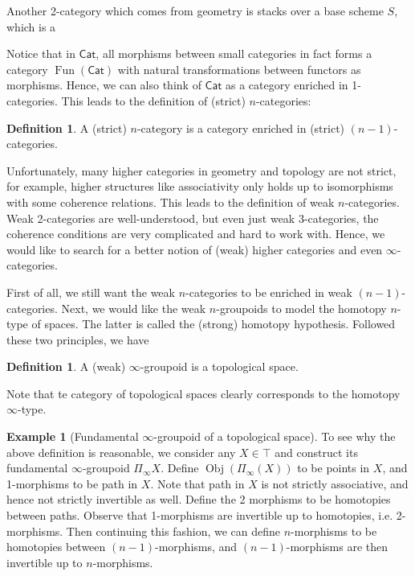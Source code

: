 \documentclass[11pt]{amsart}
\numberwithin{equation}{section}
\theoremstyle{definition}
\newtheorem{example}[thm]{Example}
\newtheorem{defn}[thm]{Definition}
\theoremstyle{remark}
\numberwithin{equation}{section}
\newcommand{\ob}{\operatorname{Obj}}
\newcommand{\cat}{\mathsf{Cat}}
\newcommand{\fun}{\operatorname{Fun}}
\begin{document}
Another 2-category which comes from geometry is stacks over a base scheme $S$, which is a 

Notice that in $\cat$, all morphisms between small categories in fact forms a category $\fun(\cat)$ with natural transformations between functors as morphisms. Hence, we can also think of $\cat$ as a category enriched in 1-categories. This leads to the definition of (strict) $n$-categories:

\begin{defn}
	A (strict) $n$-category is a category enriched in (strict) $(n-1)$-categories.
\end{defn}

Unfortunately, many higher categories in geometry and topology are not strict, for example, higher structures like associativity only holds up to isomorphisms with some coherence relations. This leads to the definition of weak $n$-categories. Weak 2-categories are well-understood, but even just weak 3-categories, the coherence conditions are very complicated and hard to work with. Hence, we would like to search for a better notion of (weak) higher categories and even $\infty$-categories.

First of all, we still want the weak $n$-categories to be enriched in weak $(n-1)$-categories. Next, we would like the weak $n$-groupoids to model the homotopy $n$-type of spaces. The latter is called the (strong) homotopy hypothesis. Followed these two principles, we have

\begin{defn}
	A (weak) $\infty$-groupoid is a topological space.
\end{defn}
Note that te category of topological spaces clearly corresponds to the homotopy $\infty$-type. 

\begin{example}[Fundamental $\infty$-groupoid of a topological space]
	To see why the above definition is reasonable, we consider any $X\in \top$ and construct its fundamental $\infty$-groupoid $\Pi_{\infty} X$. Define $\ob (\Pi_{\infty}(X))$ to be points in $X$, and 1-morphisms to be path in $X$. Note that path in $X$ is not strictly associative, and hence not strictly invertible as well. Define the 2 morphisms to be homotopies between paths. Observe that 1-morphisms are invertible up to homotopies, i.e. 2-morphisms. Then continuing this fashion, we can define $n$-morphisms to be homotopies between $(n-1)$-morphisms, and $(n-1)$-morphisms are then invertible up to $n$-morphisms.
\end{example}
\end{document}
